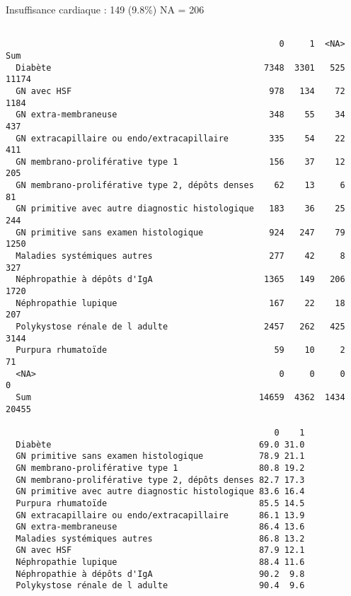 \documentclass[11pt,a4paper]{article}\usepackage[]{graphicx}\usepackage[]{color}
\makeatletter
\newenvironment{kframe}{%
 \def\at@end@of@kframe{}%
 \ifinner\ifhmode%
  \def\at@end@of@kframe{\end{minipage}}%
  \begin{minipage}{\columnwidth}%
 \fi\fi%
 \def\FrameCommand##1{\hskip\@totalleftmargin \hskip-\fboxsep
 \colorbox{shadecolor}{##1}\hskip-\fboxsep
     \hskip-\linewidth \hskip-\@totalleftmargin \hskip\columnwidth}%
 \MakeFramed {\advance\hsize-\width
   \@totalleftmargin\z@ \linewidth\hsize
   \@setminipage}}%
 {\par\unskip\endMakeFramed%
 \at@end@of@kframe}
\newenvironment{knitrout}{}{} %
\makeatother
\begin{document}
Insuffisance cardiaque : 149 (9.8\%) NA = 206

\begin{knitrout}
\color{fgcolor}\begin{kframe}
\begin{verbatim}
                                                 
                                                      0     1  <NA>   Sum
  Diabète                                          7348  3301   525 11174
  GN avec HSF                                       978   134    72  1184
  GN extra-membraneuse                              348    55    34   437
  GN extracapillaire ou endo/extracapillaire        335    54    22   411
  GN membrano-proliférative type 1                  156    37    12   205
  GN membrano-proliférative type 2, dépôts denses    62    13     6    81
  GN primitive avec autre diagnostic histologique   183    36    25   244
  GN primitive sans examen histologique             924   247    79  1250
  Maladies systémiques autres                       277    42     8   327
  Néphropathie à dépôts d'IgA                      1365   149   206  1720
  Néphropathie lupique                              167    22    18   207
  Polykystose rénale de l adulte                   2457   262   425  3144
  Purpura rhumatoïde                                 59    10     2    71
  <NA>                                                0     0     0     0
  Sum                                             14659  4362  1434 20455
                                                 
                                                     0    1
  Diabète                                         69.0 31.0
  GN primitive sans examen histologique           78.9 21.1
  GN membrano-proliférative type 1                80.8 19.2
  GN membrano-proliférative type 2, dépôts denses 82.7 17.3
  GN primitive avec autre diagnostic histologique 83.6 16.4
  Purpura rhumatoïde                              85.5 14.5
  GN extracapillaire ou endo/extracapillaire      86.1 13.9
  GN extra-membraneuse                            86.4 13.6
  Maladies systémiques autres                     86.8 13.2
  GN avec HSF                                     87.9 12.1
  Néphropathie lupique                            88.4 11.6
  Néphropathie à dépôts d'IgA                     90.2  9.8
  Polykystose rénale de l adulte                  90.4  9.6
\end{verbatim}
\end{kframe}
\end{knitrout}
\end{document}
